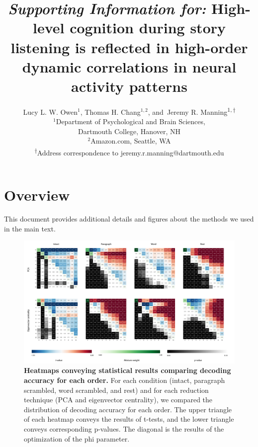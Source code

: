 \documentclass{article}
\title{\textit{Supporting Information for: } High-level cognition during story listening is reflected in high-order dynamic correlations in neural activity patterns}
\author{Lucy L. W. Owen$^1$, Thomas H. Chang$^{1,2}$, and\
  Jeremy R. Manning\textsuperscript{$1, \dagger$}\\
  [0.1in]$^1$Department of Psychological and Brain
  Sciences,\\Dartmouth
  College, Hanover, NH\\
  $^2$Amazon.com, Seattle, WA\\
  \textsuperscript{$\dagger$}Address correspondence to
  jeremy.r.manning@dartmouth.edu}
\begin{document}
\maketitle

\setcounter{equation}{0}
\setcounter{figure}{0}
\setcounter{table}{0}
\setcounter{page}{1}
\setcounter{section}{0}
\makeatletter
\renewcommand{\theequation}{S\arabic{equation}}
\renewcommand{\thefigure}{S\arabic{figure}}
\renewcommand{\bibnumfmt}[1]{[S#1]}
\renewcommand{\citenumfont}[1]{S#1}


\section*{Overview}
This document provides additional details and figures about the methods we used in the main text.

\begin{figure}[p!]
\centering
\includegraphics[width=1\textwidth]{figs/stats_heatmaps}
\caption{\small \textbf{Heatmaps conveying statistical results comparing decoding accuracy for each order.}  For each condition (intact, paragraph scrambled, word scrambled, and rest) and for each reduction technique (PCA and eigenvector centrality), we compared the distribution of decoding accuracy for each order. The upper triangle of each heatmap conveys the results of t-tests, and the lower triangle conveys corresponding p-values.  The diagonal is the results of the optimization of the phi parameter. }
\label{fig:stats_heatmaps}
\end{figure}
\end{document}

